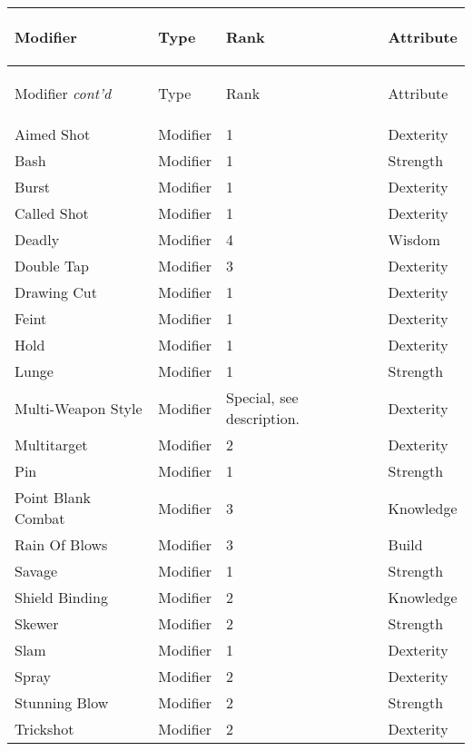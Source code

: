 \documentclass[twoside]{book}
\begin{document}
\begin{longtable}{p{1.25in}lll} 
  Modifier& \begin{turn}{70}{Type}\end{turn}
          & \begin{turn}{70}{Rank}\end{turn}
          & \begin{turn}{70}{Attribute}\end{turn}
          \\
  \hline
  \hline
  \endfirsthead
  Modifier \textit{cont'd}
        & \begin{turn}{70}{Type}\end{turn}
          & \begin{turn}{70}{Rank}\end{turn}
          & \begin{turn}{70}{Attribute}\end{turn}
           \\
  \hline
  \endhead
\raggedright Aimed Shot & Modifier & 1 & Dexterity \tabularnewline
      \raggedright Bash & Modifier & 1 & Strength \tabularnewline
      \raggedright Burst & Modifier & 1 & Dexterity \tabularnewline
      \raggedright Called Shot & Modifier & 1 & Dexterity \tabularnewline
      \raggedright Deadly & Modifier & 4 & Wisdom \tabularnewline
      \raggedright Double Tap & Modifier & 3 & Dexterity \tabularnewline
      \raggedright Drawing Cut & Modifier & 1 & Dexterity \tabularnewline
      \raggedright Feint & Modifier & 1 & Dexterity \tabularnewline
      \raggedright Hold & Modifier & 1 & Dexterity \tabularnewline
      \raggedright Lunge & Modifier & 1 & Strength \tabularnewline
      \raggedright Multi-Weapon Style & Modifier & Special, see
           description. & Dexterity \tabularnewline
      \raggedright Multitarget & Modifier & 2 & Dexterity \tabularnewline
      \raggedright Pin & Modifier & 1 & Strength \tabularnewline
      \raggedright Point Blank Combat & Modifier & 3 & Knowledge \tabularnewline
      \raggedright Rain Of Blows & Modifier & 3 & Build \tabularnewline
      \raggedright Savage & Modifier & 1 & Strength \tabularnewline
      \raggedright Shield Binding & Modifier & 2 & Knowledge \tabularnewline
      \raggedright Skewer & Modifier & 2 & Strength \tabularnewline
      \raggedright Slam & Modifier & 1 & Dexterity \tabularnewline
      \raggedright Spray & Modifier & 2 & Dexterity \tabularnewline
      \raggedright Stunning Blow & Modifier & 2 & Strength \tabularnewline
      \raggedright Trickshot & Modifier & 2 & Dexterity \tabularnewline
      
\end{longtable}
    
\end{document}
